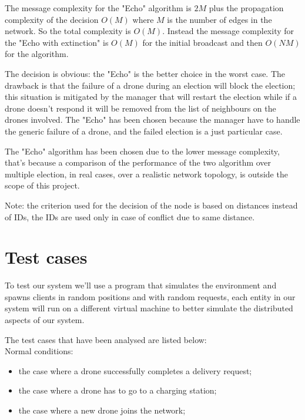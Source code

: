 \documentclass[a4paper, oneside]{memoir}
\begin{document}
The message complexity for the "Echo" algorithm is $2M$ plus the propagation complexity of the decision $O(M)$ where $M$ is the number of edges in the network. So the total complexity is $ O(M) $.
Instead the message complexity for the "Echo with extinction" is $O(M)$ for the initial broadcast and then $O(N M)$ for the algorithm.

The decision is obvious: the "Echo" is the better choice in the worst case. The drawback is that the failure of a drone during an election will block the election; this situation is mitigated by the manager that will restart the election while if a drone doesn't respond it will be removed from the list of neighbours on the drones involved. The "Echo" has been chosen because the manager have to handle the generic failure of a drone, and the failed election is a just particular case.

The "Echo" algorithm has been chosen due to the lower message complexity, that's because a comparison of the performance of the two algorithm over multiple election, in real cases, over a realistic network topology, is outside the scope of this project.

Note: the criterion used for the decision of the node is based on distances instead of IDs, the IDs are used only in case of conflict due to same distance.


\section{Test cases}

To test our system we'll use a program that simulates the environment and spawns clients in random positions and with random requests, each entity in our system will run on a different virtual machine to better simulate the distributed aspects of our system.

The test cases that have been analysed are listed below:\\

Normal conditions:
\begin{itemize}
	\item the case where a drone successfully completes a delivery request;
	\item the case where a drone has to go to a charging station;
	\item the case where a new drone joins the network;
\end{itemize}
\end{document}
